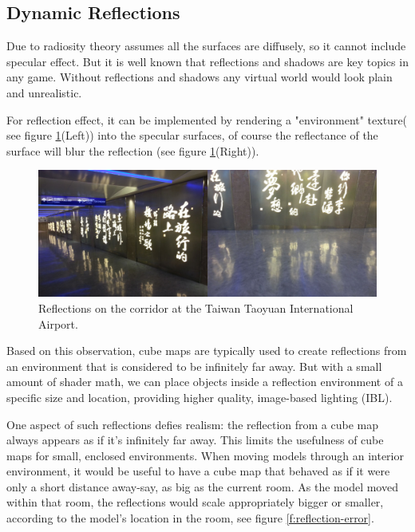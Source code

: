 \subsection{Dynamic Reflections}
Due to radiosity theory assumes all the surfaces are diffusely, so it cannot include specular effect. But it is well known that reflections and shadows are key topics in any game. Without reflections and shadows any virtual world would look plain and unrealistic. 

For reflection effect, it can be implemented by rendering a "environment" texture( see figure \ref{f:reflection-case}(Left)) into the specular surfaces, of course the reflectance of the surface will blur the reflection (see figure \ref{f:reflection-case}(Right)).

\begin{figure}\label{f:reflection-case}
	\includegraphics[width=1.0\textwidth]{graphics/gi/path-31}
	\caption{Reflections on the corridor at the Taiwan Taoyuan International Airport.}
\end{figure}

Based on this observation, cube maps\cite{a:EnvironmentMappingandOtherApplicationsofWorldProjections} are typically used to create reflections from an environment that is considered to be infinitely far away. But with a small amount of shader math, we can place objects inside a reflection environment of a specific size and location, providing higher quality, image-based lighting (IBL).

One aspect of such reflections defies realism: the reflection from a cube map always appears as if it's infinitely far away. This limits the usefulness of cube maps for small, enclosed environments. When moving models through an interior environment, it would be useful to have a cube map that behaved as if it were only a short distance away-say, as big as the current room. As the model moved within that room, the reflections would scale appropriately bigger or smaller, according to the model's location in the room, see figure \ref{f:reflection-error}.

